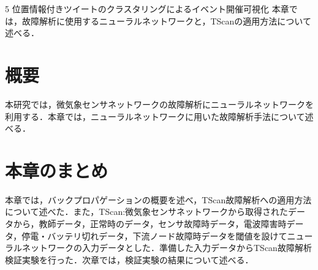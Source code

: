 \chapterhead
{5}
{位置情報付きツイートのクラスタリングによるイベント開催可視化}
{本章では，故障解析に使用するニューラルネットワークと，TScanの適用方法について述べる．}

\section{概要}
本研究では，微気象センサネットワークの故障解析にニューラルネットワークを利用する．本章では，ニューラルネットワークに用いた故障解析手法について述べる．

\newpage

\section{本章のまとめ}
本章では，バックプロパゲーションの概要を述べ，TScan故障解析への適用方法について述べた．また，TScan:微気象センサネットワークから取得されたデータから，教師データ，正常時のデータ，センサ故障時データ，電波障害時データ，停電・バッテリ切れデータ，下流ノード故障時データを閾値を設けてニューラルネットワークの入力データとした．準備した入力データからTScan故障解析検証実験を行った．次章では，検証実験の結果について述べる．
\newpage
